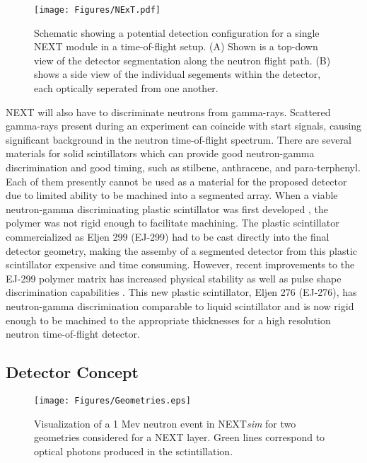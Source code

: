 \documentclass[preprint,3p,twocolumn]{elsarticle}
\begin{document}
\begin{figure}[tp]
  \centering
  \texttt{[image: Figures/NExT.pdf]}
  \caption{Schematic showing a potential detection configuration for a single NEXT module in a time-of-flight setup. (A) Shown is a top-down view of the detector segmentation along the neutron flight path. (B) shows a side view of the individual segements within the detector, each optically seperated from one another.}
  \label{fig:NEXTschematic}
\end{figure}
NEXT will also have to discriminate neutrons from gamma-rays. Scattered gamma-rays present during an experiment can coincide with start signals, causing significant background in the neutron time-of-flight spectrum.
There are several materials for solid scintillators which can provide good neutron-gamma discrimination and good timing, such as stilbene, anthracene, and para-terphenyl. Each of them presently cannot be used as a material for the proposed detector due to limited ability to be machined into a segmented array. When a viable neutron-gamma discriminating plastic scintillator was first developed \cite{Zaitseva2012}, the polymer was not rigid enough to facilitate machining. The plastic scintillator commercialized as Eljen 299 (EJ-299) had to be cast directly into the final detector geometry, making the assemby of a segmented detector from this plastic scintillator expensive and time consuming. However, recent improvements to the EJ-299 polymer matrix has increased physical stability as well as pulse shape discrimination capabilities \cite{ZAITSEVA201897}. This new plastic scintillator, Eljen 276 (EJ-276), has neutron-gamma discrimination comparable to liquid scintillator and is now rigid enough to be machined to the appropriate thicknesses for a high resolution neutron time-of-flight detector.

\subsection{Detector Concept}
\begin{figure}[tp]
 \centering
  \texttt{[image: Figures/Geometries.eps]}
  \caption{Visualization of a 1 Mev neutron event in NEXT\emph{sim} for two geometries considered for a NEXT layer. Green lines correspond to optical photons produced in the sctintillation.}
  \label{fig:Geometries}
\end{figure} 
\end{document}
